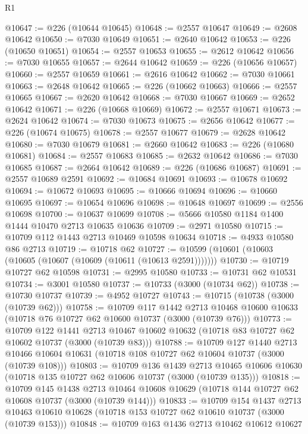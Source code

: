\begin{lexlean}{R1}
\begin{coremodule}
@10647 := @226 (@10644 @10645)
@10648 := @2557 @10647
@10649 := @2608 @10642
@10650 := @7030 @10649
@10651 := @2640 @10642
@10653 := @226 (@10650 @10651)
@10654 := @2557 @10653
@10655 := @2612 @10642
@10656 := @7030 @10655
@10657 := @2644 @10642
@10659 := @226 (@10656 @10657)
@10660 := @2557 @10659
@10661 := @2616 @10642
@10662 := @7030 @10661
@10663 := @2648 @10642
@10665 := @226 (@10662 @10663)
@10666 := @2557 @10665
@10667 := @2620 @10642
@10668 := @7030 @10667
@10669 := @2652 @10642
@10671 := @226 (@10668 @10669)
@10672 := @2557 @10671
@10673 := @2624 @10642
@10674 := @7030 @10673
@10675 := @2656 @10642
@10677 := @226 (@10674 @10675)
@10678 := @2557 @10677
@10679 := @2628 @10642
@10680 := @7030 @10679
@10681 := @2660 @10642
@10683 := @226 (@10680 @10681)
@10684 := @2557 @10683
@10685 := @2632 @10642
@10686 := @7030 @10685
@10687 := @2664 @10642
@10689 := @226 (@10686 @10687)
@10691 := @2557 @10689 @2591
@10692 := @10684 @10691
@10693 := @10678 @10692
@10694 := @10672 @10693
@10695 := @10666 @10694
@10696 := @10660 @10695
@10697 := @10654 @10696
@10698 := @10648 @10697
@10699 := @2556 @10698
@10700 := @10637 @10699
@10708 := @5666 @10580 @1184 @1400 @1444 @10470 @2713 @10635 @10636
@10709 := @2971 @10580
@10715 := @10709 @112 @1443 @2713 @10469 @10598 @10634
@10718 := @4933 @10580 @86 @2713
@10719 := @10718 @62
@10727 := @10599 (@10601 (@10603 (@10605 (@10607 (@10609 (@10611 (@10613 @2591)))))))
@10730 := @10719 @10727 @62 @10598
@10731 := @2995 @10580
@10733 := @10731 @62 @10531
@10734 := @3001 @10580
@10737 := @10733 (@3000 (@10734 @62))
@10738 := @10730 @10737
@10739 := @4952 @10727
@10743 := @10715 (@10738 (@3000 (@10739 @62)))
@10758 := @10709
    @117
    @1442
    @2713
    @10468
    @10600
    @10633
    (@10718 @76 @10727 @62 @10600 @10737 (@3000 (@10739 @76)))
@10773 := @10709
    @122
    @1441
    @2713
    @10467
    @10602
    @10632
    (@10718 @83 @10727 @62 @10602 @10737 (@3000 (@10739 @83)))
@10788 := @10709
    @127
    @1440
    @2713
    @10466
    @10604
    @10631
    (@10718 @108 @10727 @62 @10604 @10737 (@3000 (@10739 @108)))
@10803 := @10709
    @136
    @1439
    @2713
    @10465
    @10606
    @10630
    (@10718 @135 @10727 @62 @10606 @10737 (@3000 (@10739 @135)))
@10818 := @10709
    @145
    @1438
    @2713
    @10464
    @10608
    @10629
    (@10718 @144 @10727 @62 @10608 @10737 (@3000 (@10739 @144)))
@10833 := @10709
    @154
    @1437
    @2713
    @10463
    @10610
    @10628
    (@10718 @153 @10727 @62 @10610 @10737 (@3000 (@10739 @153)))
@10848 := @10709
    @163
    @1436
    @2713
    @10462
    @10612
    @10627

\end{coremodule}
\end{lexlean}
